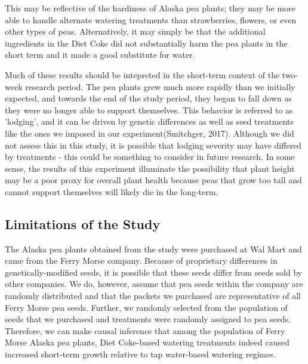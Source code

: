 \documentclass[1p,12pt]{elsarticle}\usepackage[]{graphicx}\usepackage[]{color}
\begin{document}
This may be reflective of the hardiness of Alaska pea plants; they may be more able to handle alternate watering treatments than strawberries, flowers, or even other types of peas. Alternatively, it may simply be that the additional ingredients in the Diet Coke did not substantially harm the pea plants in the short term and it made a good substitute for water.

Much of these results should be intepreted in the short-term context of the two-week research period. The pea plants grew much more rapidly than we initially expected, and towards the end of the study period, they began to fall down as they were no longer able to support themselves. This behavior is referred to as 'lodging', and it can be driven by genetic differences as well as seed treatments like the ones we imposed in our experiment(Smitchger, 2017). Although we did not assess this in this study, it is possible that lodging severity may have differed by treatments - this could be something to consider in future research. In some sense, the results of this experiment illuminate the possibility that plant height may be a poor proxy for overall plant health because peas that grow too tall and cannot support themselves will likely die in the long-term. 

\subsection{Limitations of the Study}

The Alaska pea plants obtained from the study were purchased at Wal Mart and came from the Ferry Morse company. Because of proprietary differences in genetically-modified seeds, it is possible that these seeds differ from seeds sold by other companies. We do, however, assume that pea seeds within the company are randomly distributed and that the packets we purchased are representative of all Ferry Morse pea seeds. Further, we randomly selected from the population of seeds that we purchased and treatments were randomly assigned to pea seeds. Therefore, we can make causal inference that among the population of Ferry Morse Alaska pea plants, Diet Coke-based watering treatments indeed caused increased short-term growth relative to tap water-based watering regimes. 
\end{document}

